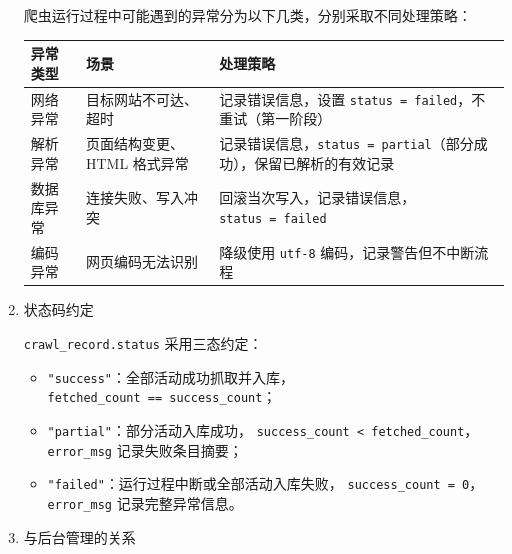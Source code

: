 \documentclass[UTF8,a4paper,12pt,fontset=none]{ctexrep}
\providecommand{\tightlist}{}
\newcounter{none}
\begin{document}
\begin{enumerate}
  爬虫运行过程中可能遇到的异常分为以下几类，分别采取不同处理策略：

  {\def\LTcaptype{none} %
  \begin{longtable}[]{@{}
    >{\raggedright\arraybackslash}p{}
    >{\raggedright\arraybackslash}p{}
    >{\raggedright\arraybackslash}p{}@{}}
  \toprule\noalign{}
  \begin{minipage}[b]{\linewidth}\raggedright
  异常类型
  \end{minipage} & \begin{minipage}[b]{\linewidth}\raggedright
  场景
  \end{minipage} & \begin{minipage}[b]{\linewidth}\raggedright
  处理策略
  \end{minipage} \\
  \midrule\noalign{}
  \endhead
  \bottomrule\noalign{}
  \endlastfoot
  网络异常 & 目标网站不可达、超时 & 记录错误信息，设置 \texttt{status\ =\ \textquotesingle{}failed\textquotesingle{}}，不重试（第一阶段） \\
  解析异常 & 页面结构变更、HTML 格式异常 & 记录错误信息，\texttt{status\ =\ \textquotesingle{}partial\textquotesingle{}}（部分成功），保留已解析的有效记录 \\
  数据库异常 & 连接失败、写入冲突 & 回滚当次写入，记录错误信息，\texttt{status\ =\ \textquotesingle{}failed\textquotesingle{}} \\
  编码异常 & 网页编码无法识别 & 降级使用 \texttt{utf-8} 编码，记录警告但不中断流程 \\
  \end{longtable}
  }
\item
  状态码约定

  \texttt{crawl\_record.status} 采用三态约定：

  \begin{itemize}
  \tightlist
  \item
    \texttt{"success"}：全部活动成功抓取并入库，\texttt{fetched\_count\ ==\ success\_count}；
  \item
    \texttt{"partial"}：部分活动入库成功，
    \texttt{success\_count\ <\ fetched\_count}，
    \texttt{error\_msg} 记录失败条目摘要；
  \item
    \texttt{"failed"}：运行过程中断或全部活动入库失败，
    \texttt{success\_count\ =\ 0}，
    \texttt{error\_msg} 记录完整异常信息。
  \end{itemize}
\item
  与后台管理的关系


\end{enumerate}
\end{document}
